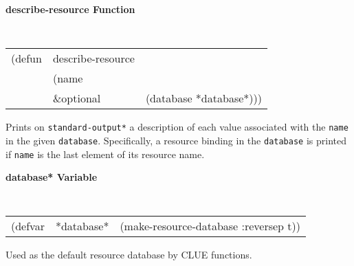 {\samepage
{\large {\bf describe-resource \hfill Function}} 
\begin{flushright} \parbox[t]{6.125in}{
\tt
\begin{tabular}{lll}
\raggedright
(defun & describe-resource & \\ 
& (name\\
& \&optional & (database *database*)))
\end{tabular}
\rm

}\end{flushright}}

\begin{flushright} \parbox[t]{6.125in}{
Prints  on {\tt *standard-output*} a description of each value associated with
the {\tt name} in the given {\tt database}. Specifically, a resource binding
in the {\tt database} is printed if {\tt name} is the last element of its
resource name.

}\end{flushright}


{\samepage
{\large {\bf *database* \hfill Variable}} 
\begin{flushright} \parbox[t]{6.125in}{
\tt
\begin{tabular}{lll}
\raggedright
(defvar & *database* & (make-resource-database :reversep t))
\end{tabular}
\rm

}\end{flushright}}

\begin{flushright} \parbox[t]{6.125in}{
Used as the default resource database by CLUE functions.

}\end{flushright}



